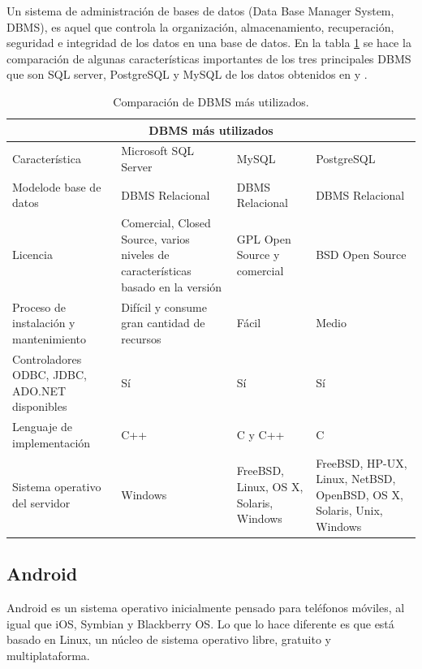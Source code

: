 		Un sistema de administración de bases de datos (Data Base Manager System, DBMS), es aquel que controla la organización, almacenamiento, recuperación, seguridad e integridad de los datos en una base de datos. En la tabla \ref{tabla:dbms} se hace la comparación de algunas características importantes de los tres principales DBMS que son SQL server, PostgreSQL y MySQL de los datos obtenidos en \cite{Hsu2008} y \cite{dbms}.

		\begin{table}[H]
			\centering
			\begin{tabular}{| p{4cm} | p{3.5cm} | p{3.5cm} | p{3.5cm} |}
				\hline
				\multicolumn{4}{|c|}{DBMS más utilizados} \\
				\hline
				Característica	&	Microsoft SQL Server	&	MySQL	&	PostgreSQL\\
				\hline \hline

				Modelode base de datos	&	DBMS Relacional	&	DBMS Relacional	&	DBMS Relacional\\
			\hline

				Licencia	&	Comercial, Closed Source, varios niveles de características basado en la versión	&	GPL Open Source y comercial	&	BSD Open Source\\
			\hline

				Proceso de instalación y mantenimiento	&	Difícil y consume gran cantidad de recursos	&	Fácil	&	Medio\\
			\hline

				Controladores ODBC, JDBC, ADO.NET disponibles	&	Sí	&	Sí	&	Sí\\
			\hline

				Lenguaje de implementación	&	C++	&	C y C++	&	C\\
			\hline
				Sistema operativo del servidor	&	Windows	&	FreeBSD, Linux, OS X, Solaris, Windows	&	FreeBSD, HP-UX, Linux, NetBSD, OpenBSD, OS X, Solaris, Unix, Windows\\
			\hline
			\end{tabular}
			\caption{Comparación de DBMS más utilizados.}
			\label{tabla:dbms}
		\end{table}

		\subsection{Android}

		Android es un sistema operativo inicialmente pensado para teléfonos móviles, al igual que iOS, Symbian y Blackberry OS. Lo que lo hace diferente es que está basado en Linux, un núcleo de sistema operativo libre, gratuito y multiplataforma.

